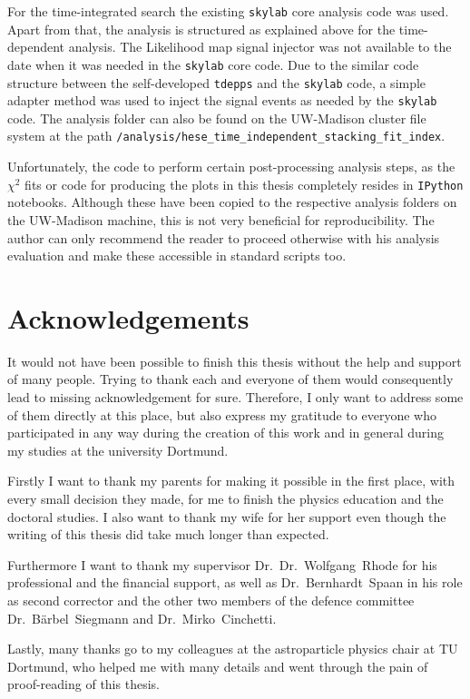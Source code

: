 For the time-integrated search the existing \lstinline!skylab! core analysis code was used.
Apart from that, the analysis is structured as explained above for the time-dependent analysis.
The Likelihood map signal injector was not available to the date when it was needed in the \lstinline!skylab! core code.
Due to the similar code structure between the self-developed \lstinline!tdepps! and the \lstinline!skylab! code, a simple adapter method was used to inject the signal events as needed by the \lstinline!skylab! code.
The analysis folder can also be found on the UW-Madison cluster file system at the path \lstinline!/analysis/hese_time_independent_stacking_fit_index!.

Unfortunately, the code to perform certain post-processing analysis steps, as the $\chi^2$ fits or code for producing the plots in this thesis completely resides in \lstinline!IPython! notebooks.
Although these have been copied to the respective analysis folders on the UW-Madison machine, this is not very beneficial for reproducibility.
The author can only recommend the reader to proceed otherwise with his analysis evaluation and make these accessible in standard scripts too.

\newpage
\section{Acknowledgements}
It would not have been possible to finish this thesis without the help and support of many people.
Trying to thank each and everyone of them would consequently lead to missing acknowledgement for sure.
Therefore, I only want to address some of them directly at this place, but also express my gratitude to everyone who participated in any way during the creation of this work and in general during my studies at the university Dortmund.

Firstly I want to thank my parents for making it possible in the first place, with every small decision they made, for me to finish the physics education and the doctoral studies.
I also want to thank my wife for her support even though the writing of this thesis did take much longer than expected.

Furthermore I want to thank my supervisor Dr.~Dr.~Wolfgang~Rhode for his professional and the financial support, as well as Dr.~Bernhardt~Spaan in his role as second corrector and the other two members of the defence committee Dr.~Bärbel~Siegmann and Dr.~Mirko~Cinchetti.

Lastly, many thanks go to my colleagues at the astroparticle physics chair at TU Dortmund, who helped me with many details and went through the pain of proof-reading of this thesis.

